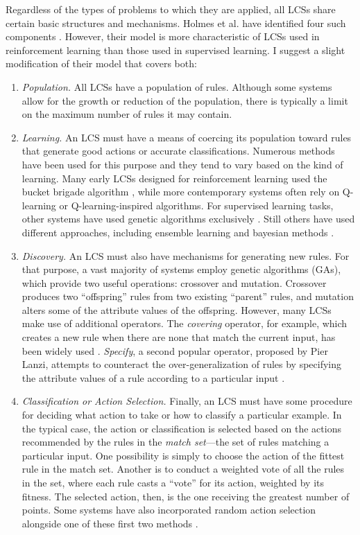 \documentclass[11pt]{article}
\begin{document}
Regardless of the types of problems to which they are applied, all LCSs share certain basic structures and mechanisms. Holmes et al. have identified four such components  \cite{holmes_learning_2002}. However, their model is more characteristic of LCSs used in reinforcement learning than those used in supervised learning. I suggest a slight modification of their model that covers both:
\begin{enumerate}
\item \emph{Population.} All LCSs have a population of rules. Although some systems allow for the growth or reduction of the population, there is typically a limit on the maximum number of rules it may contain.
\item \emph{Learning.} An LCS must have a means of coercing its population toward rules that generate good actions or accurate classifications. Numerous methods have been used for this purpose and they tend to vary based on the kind of learning. Many early LCSs designed for reinforcement learning used the bucket brigade algorithm \cite{holland_properties_1985}, while more contemporary systems often rely on Q-learning \cite{c._j._c._h._learning_1989, orriols-puig_fuzzy-ucs:_2009} or Q-learning-inspired algorithms. For supervised learning tasks, other systems have used genetic algorithms exclusively \cite{llora_towards_2007}. Still others have used different approaches, including ensemble learning \cite{gao_learning_2005} and bayesian methods \cite{hai_h._dam_bcs:_2006}.
\item \emph{Discovery.} An LCS must also have mechanisms for generating new rules. For that purpose, a vast majority of systems employ genetic algorithms (GAs), which provide two useful operations: crossover and mutation. Crossover produces two ``offspring'' rules from two existing ``parent'' rules, and mutation alters some of the attribute values of the offspring. However, many LCSs make use of additional operators. The \emph{covering} operator, for example, which creates a new rule when there are none that match the current input, has been widely used \cite{orriols-puig_fuzzy-ucs:_2009, wilson_classifier_1995, bernado-mansilla_accuracy-based_2003}. \emph{Specify}, a second popular operator, proposed by Pier Lanzi,  attempts to counteract the over-generalization of rules by specifying the attribute values of a rule according to a particular input \cite{lanzi_study_1997}. 
\item \emph{Classification or Action Selection.} Finally, an LCS must have some procedure for deciding what action to take or how to classify a particular example. In the typical case, the action or classification is selected based on the actions recommended by the rules in the \emph{match set}---the set of rules matching a particular input. One possibility is simply to choose the action of the fittest rule in the match set. Another is to conduct a weighted vote of all the rules in the set, where each rule casts a ``vote'' for its action, weighted by its fitness. The selected action, then, is the one receiving the greatest number of points. Some systems have also incorporated random action selection alongside one of these first two methods \cite{wilson_classifier_1995}.
\end{enumerate}
\end{document}
